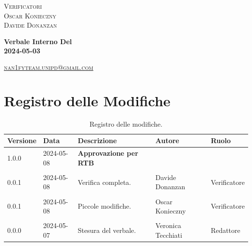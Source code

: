 \documentclass[8pt]{article}
\begin{document}
\begin{titlepage}
\begin{minipage}[t]{0.47\textwidth}
		{\large{\textsc{Verificatori}}
			\vspace{3mm}
			{\\\large{\textsc{Oscar Konieczny}\\}} %
			{\large{\textsc{Davide Donanzan}}}
			
		}
		\vspace{4mm}\vspace{4mm}
	\end{minipage}
	\vspace{4cm}
	\begin{center}
		\begin{flushright}
			{\fontsize{30pt}{52pt}\selectfont \textbf{Verbale Interno Del\\2024-05-03\\}} %
		\end{flushright}
		\vspace{3cm}
	\end{center}
	\vspace{8 cm}
	{\small \textsc{\href{mailto: nan1fyteam.unipd@gmail.com}{nan1fyteam.unipd@gmail.com}}}
\end{titlepage}
\pagestyle{mystyle}
\section*{Registro delle Modifiche}
\begin{table}[ht!]	
	\centering
	\begin{tabular}{p{1.2cm} p{2cm} p{6cm} p{3cm} p{2cm}}
		\toprule
		\textbf{Versione}& \textbf{Data} & \textbf{Descrizione} & \textbf{Autore} & \textbf{Ruolo} \\
		\midrule
		1.0.0 & 2024-05-08 & \textbf{Approvazione per RTB} & & \\\\
		0.0.1 & 2024-05-08 & Verifica completa. & Davide Donanzan & Verificatore \\\\
		0.0.1 & 2024-05-08 & Piccole modifiche. & Oscar Konieczny & Verificatore \\\\
		0.0.0 & 2024-05-07 & Stesura del verbale. & Veronica Tecchiati & Redattore \\
		\bottomrule
	\end{tabular}
	\caption{Registro delle modifiche.}
	\label{table:Registro delle modifiche}
\end{table}
\newpage
\tableofcontents
\clearpage
\newpage
\justifying
\end{document}

